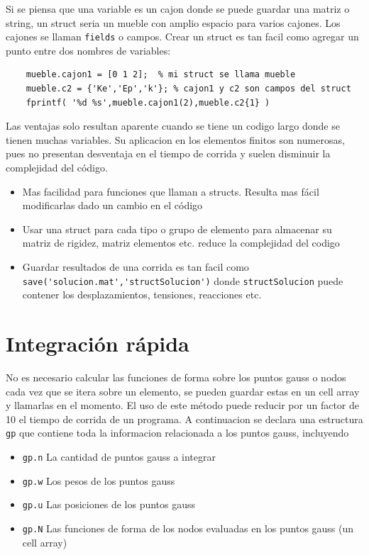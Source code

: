 \documentclass[11pt, a4paper,titlepage]{article}
\begin{document}
Si se piensa que una variable es un cajon donde se puede guardar una matriz o string, un struct seria un mueble con amplio espacio para varios cajones. Los cajones se llaman \verb|fields| o campos. Crear un struct es tan facil como agregar un punto entre dos nombres de variables:

\begin{verbatim}
    mueble.cajon1 = [0 1 2];  % mi struct se llama mueble
    mueble.c2 = {'Ke','Ep','k'}; % cajon1 y c2 son campos del struct 
    fprintf( '%d %s',mueble.cajon1(2),mueble.c2{1} )
\end{verbatim}

Las ventajas solo resultan aparente cuando se tiene un codigo largo donde se tienen muchas variables. Su aplicacion en los elementos finitos son numerosas, pues no presentan desventaja en el tiempo de corrida y suelen disminuir la complejidad del código.

\begin{itemize}
	\item Mas facilidad para funciones que llaman a structs. Resulta mas fácil modificarlas dado un cambio en el código
	\item Usar una struct para cada tipo o grupo de elemento para almacenar su matriz de rigidez, matriz elementos etc. reduce la complejidad del codigo
	\item Guardar resultados de una corrida es tan facil como \verb|save('solucion.mat','structSolucion')| donde \verb|structSolucion| puede contener los desplazamientos, tensiones, reacciones etc.
\end{itemize}



\section{Integración rápida}
No es necesario calcular las funciones de forma sobre los puntos gauss o nodos cada vez que se itera sobre un elemento, se pueden guardar estas en un cell array y llamarlas en el momento. El uso de este método puede reducir por un factor de 10 el tiempo de corrida de un programa. A continuacion se declara una estructura \verb|gp| que contiene toda la informacion relacionada a los puntos gauss, incluyendo

\begin{itemize}
	\item \verb|gp.n| La cantidad de puntos gauss a integrar
	\item \verb|gp.w| Los pesos de los puntos gauss
	\item \verb|gp.u| Las posiciones de los puntos gauss
	\item \verb|gp.N| Las funciones de forma de los nodos evaluadas en los puntos gauss (un cell array)
\end{itemize}
\end{document}
